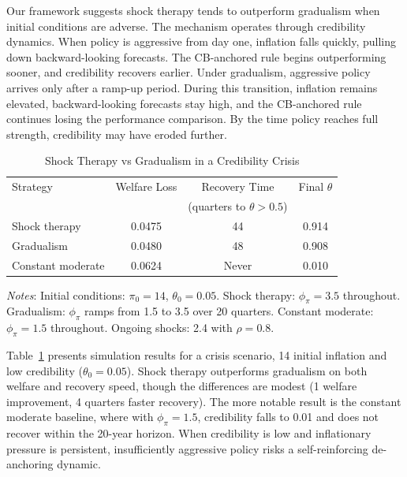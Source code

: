 \documentclass[10pt]{article}
\begin{document}
Our framework suggests shock therapy tends to outperform gradualism when initial conditions are adverse. The mechanism operates through credibility dynamics. When policy is aggressive from day one, inflation falls quickly, pulling down backward-looking forecasts. The CB-anchored rule begins outperforming sooner, and credibility recovers earlier. Under gradualism, aggressive policy arrives only after a ramp-up period. During this transition, inflation remains elevated, backward-looking forecasts stay high, and the CB-anchored rule continues losing the performance comparison. By the time policy reaches full strength, credibility may have eroded further.

\begin{table}[htbp]
\centering
\caption{Shock Therapy vs Gradualism in a Credibility Crisis}
\label{tab:shock_gradual}
\begin{tabular}{lccc}
\toprule
Strategy & Welfare Loss & Recovery Time & Final $\theta$ \\
& & (quarters to $\theta > 0.5$) & \\
\midrule
Shock therapy & 0.0475 & 44 & 0.914 \\
Gradualism & 0.0480 & 48 & 0.908 \\
Constant moderate & 0.0624 & Never & 0.010 \\
\bottomrule
\end{tabular}
\begin{tablenotes}
\small
\item \textit{Notes}: Initial conditions: $\pi_0 = 14$, $\theta_0 = 0.05$. Shock therapy: $\phi_\pi = 3.5$ throughout. Gradualism: $\phi_\pi$ ramps from 1.5 to 3.5 over 20 quarters. Constant moderate: $\phi_\pi = 1.5$ throughout. Ongoing shocks: 2.4 with $\rho = 0.8$.
\end{tablenotes}
\end{table}

Table~\ref{tab:shock_gradual} presents simulation results for a crisis scenario, 14 initial inflation and low credibility ($\theta_0 = 0.05$). Shock therapy outperforms gradualism on both welfare and recovery speed, though the differences are modest (1 welfare improvement, 4 quarters faster recovery). The more notable result is the constant moderate baseline, where with $\phi_\pi = 1.5$, credibility falls to 0.01 and does not recover within the 20-year horizon. When credibility is low and inflationary pressure is persistent, insufficiently aggressive policy risks a self-reinforcing de-anchoring dynamic.
\end{document}
